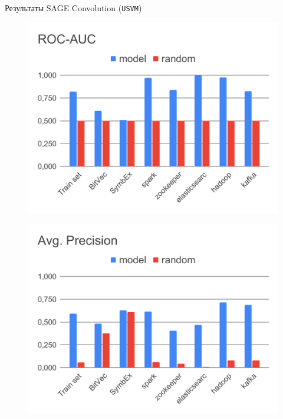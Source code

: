 \documentclass[14pt,aspectratio=169,hyperref={pdftex,unicode},xcolor=dvipsnames]{beamer}
\begin{document}
\begin{frame}{Результаты SAGE Convolution (\texttt{USVM})}

\begin{minipage}{0.5\textwidth}

\begin{figure}[ht]
\begin{center}
  \includegraphics[scale=0.33]{./assets/usvm-roc-auc.pdf}
\end{center}
\end{figure}

\end{minipage}%
\begin{minipage}{0.5\textwidth}

\begin{figure}[ht]
\begin{center}
  \includegraphics[scale=0.33]{./assets/usvm-ap.pdf}
\end{center}
\end{figure}

\end{minipage}

\end{frame}
\end{document}
